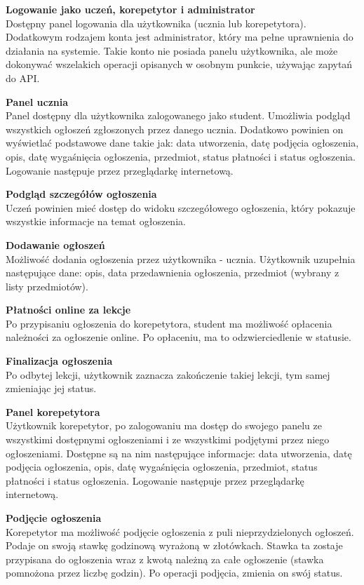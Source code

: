 \documentclass[12pt]{article}
\numberwithin{figure}{section}
\begin{document}
\begin{sloppypar}
\noindent
\textbf{Logowanie jako uczeń, korepetytor i administrator}\\
\indent  
Dostępny panel logowania dla użytkownika (ucznia lub korepetytora). Dodatkowym rodzajem konta jest administrator, który ma pełne uprawnienia do działania na systemie. Takie konto nie posiada panelu użytkownika, ale może dokonywać wszelakich operacji opisanych w osobnym punkcie, używając zapytań do API.

\noindent
\textbf{Panel ucznia}\\
\indent
Panel dostępny dla użytkownika zalogowanego jako student. Umożliwia podgląd wszystkich ogłoszeń zgłoszonych przez danego ucznia. Dodatkowo powinien on wyświetlać podstawowe dane takie jak: data utworzenia, datę podjęcia ogłoszenia, opis, datę wygaśnięcia ogłoszenia, przedmiot, status płatności i status ogłoszenia. Logowanie następuje przez przeglądarkę internetową. 

\noindent
\textbf{Podgląd szczegółów ogłoszenia}\\
\indent
Uczeń powinien mieć dostęp do widoku szczegółowego ogłoszenia, który pokazuje wszystkie informacje na temat ogłoszenia.

\noindent
\textbf{Dodawanie ogłoszeń}\\
\indent
Możliwość dodania ogłoszenia przez użytkownika - ucznia. Użytkownik uzupełnia następujące dane: opis, data przedawnienia ogłoszenia, przedmiot (wybrany z listy przedmiotów). 

\noindent
\textbf{Płatności online za lekcje}\\
\indent
Po przypisaniu ogłoszenia do korepetytora, student ma możliwość opłacenia należności za ogłoszenie online. Po opłaceniu, ma to odzwierciedlenie w statusie. 

\noindent
\textbf{Finalizacja ogłoszenia}\\
\indent
Po odbytej lekcji, użytkownik zaznacza zakończenie takiej lekcji, tym samej zmieniając jej status.

\noindent
\textbf{Panel korepetytora}\\
\indent
Użytkownik korepetytor, po zalogowaniu ma dostęp do swojego panelu ze wszystkimi dostępnymi ogłoszeniami i ze wszystkimi podjętymi przez niego ogłoszeniami. Dostępne są na nim następujące informacje: data utworzenia, datę podjęcia ogłoszenia, opis, datę wygaśnięcia ogłoszenia, przedmiot, status płatności i status ogłoszenia. Logowanie następuje przez przeglądarkę internetową. 

\noindent
\textbf{Podjęcie ogłoszenia}\\
\indent
Korepetytor ma możliwość podjęcie ogłoszenia z puli nieprzydzielonych ogłoszeń. Podaje on swoją stawkę godzinową wyrażoną w złotówkach. Stawka ta zostaje przypisana do ogłoszenia wraz z kwotą należną za całe ogłoszenie (stawka pomnożona przez liczbę godzin). Po operacji podjęcia, zmienia on swój status.


\end{sloppypar}
\end{document}
